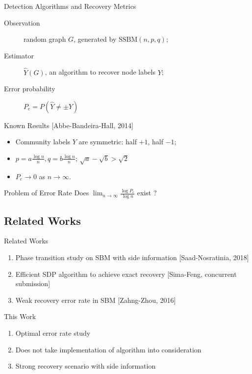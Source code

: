 \documentclass{beamer}
\begin{document}
\begin{frame}{Detection Algorithms and Recovery Metrics}
	\begin{description}
		\item[Observation] random graph $G$, generated by $\textrm{SSBM}(n,p,q)$;
		\item[Estimator] $\hat{Y}(G)$, an algorithm to recover node labels $Y$;
		\item[Error probability] $P_e=P(\hat{Y} \neq \pm Y)$
	\end{description}
	
	\begin{block}{Known Results [Abbe-Bandeira-Hall, 2014]}
		\begin{itemize}
		\item Community labels $Y$ are symmetric: half $+1$, half $-1$;
		\item $p = a\frac{ \log n}{n}, q = b \frac{ \log n}{n}$;
		$\sqrt{a} - \sqrt{b} > \sqrt{2}$
		\item $P_e \to 0$ as $n \to \infty$.
		\end{itemize}
	\end{block}
	\begin{block}{Problem of Error Rate}
	 Does $\lim_{n \to \infty}\frac{\log P_e}{\log n}$
	 exist ?
	\end{block}
\end{frame}
\subsection{Related Works}
\begin{frame}{Related Works}
	\begin{enumerate}
		\item Phase transition study on SBM with side information
		[Saad-Nosratinia, 2018]
		\item Efficient SDP algorithm to achieve exact recovery
		[Sima-Feng, concurrent submission]
		\item Weak recovery error rate in SBM
		[Zahng-Zhou, 2016]
	\end{enumerate}
	\begin{block}{This Work}
		\begin{enumerate}
			\item Optimal error rate study
			\item Does not take implementation of algorithm into consideration
			\item Strong recovery scenario with side information
		\end{enumerate}
	\end{block}
\end{frame}
\end{document}

